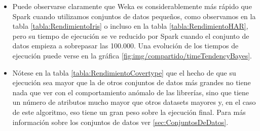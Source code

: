 \begin{itemize}
	\item Puede observarse claramente que Weka es considerablemente más rápido que Spark cuando utilizamos conjuntos de datos pequeños, como observamos en la tabla \ref{tabla:RendimientoIris} o incluso en la tabla \ref{tabla:RendimientoHAR}, pero su tiempo de ejecución se ve reducido por Spark cuando el conjunto de datos empieza a sobrepasar las 100.000. Una evolución de los tiempos de ejecución puede verse en la gráfica \ref{fig:img/compartido/timeTendencyBayes}.

	\item Nótese en la tabla \ref{tabla:RendimientoCovertype} que el hecho de que su ejecución sea mayor que la de otros conjuntos de datos más grandes no tiene nada que ver con el comportamiento anómalo de las librerías, sino que tiene un número de atributos mucho mayor que otros datasets mayores y, en el caso de este algoritmo, eso tiene un gran peso sobre la ejecución final. Para más información sobre los conjuntos de datos ver \ref{sec:ConjuntosDeDatos}.
	

\end{itemize}
